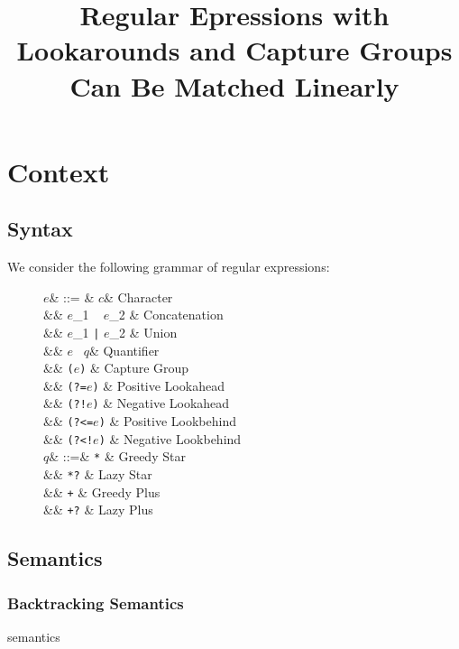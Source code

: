 \documentclass{article}
\title{Regular Epressions with Lookarounds and Capture Groups Can Be Matched Linearly}
\author{}
\date{}
\def\todo#1{{\color{ACMOrange}{TODO: }}#1}
\def\regex#1{\texttt{#1}}
\begin{document}
\maketitle


\section{Context}

\subsection{Syntax}
We consider the following grammar of regular expressions:

\def\re{\ensuremath{\mathit{e}}}
\def\char{\ensuremath{\mathit{c}}}
\def\quant{\ensuremath{\mathit{q}}}

\begin{figure}[h]
  \begin{syntax}
\re & ::= & \char & Character \\
&\mid& \re_1 ~ \re_2 & Concatenation\\
&\mid& \re_1 \regex{|} \re_2 & Union\\
&\mid&  \re ~ \quant & Quantifier \\
&\mid&  \regex{(}\re\regex{)} & Capture Group \\
&\mid& \regex{(?=}\re\regex{)} & Positive Lookahead \\
&\mid& \regex{(?!}\re\regex{)} & Negative Lookahead \\
&\mid& \regex{(?<=}\re\regex{)} & Positive Lookbehind \\
&\mid& \regex{(?<!}\re\regex{)} & Negative Lookbehind \\
%
\quant & ::=& \regex{*} & Greedy Star\\
&\mid& \regex{*?} & Lazy Star\\
&\mid& \regex{+} & Greedy Plus\\
&\mid& \regex{+?} & Lazy Plus\\
  \end{syntax}
\end{figure}

\subsection{Semantics}
\subsubsection{Backtracking Semantics}
\todo{semantics}
\end{document}
